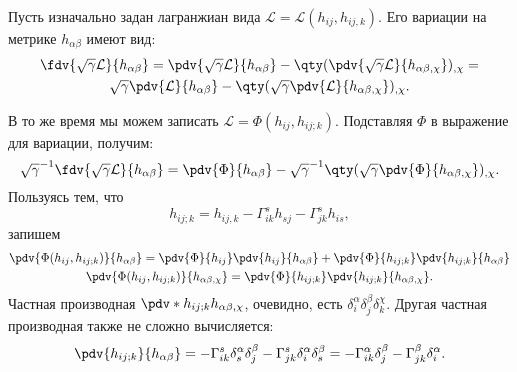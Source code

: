 \documentclass[\docroot/reports/draft/report.tex]{subfiles}
\begin{document}
    Пусть изначально задан лагранжиан вида $\mathcal{L} = \mathcal{L}(h_{ij}, h_{ij,k})$. Его вариации на метрике $h_{\alpha\beta}$ имеют вид:
    \begin{gather*}
        \fdv{\sqrt{\gamma}\mathcal{L}}{h_{\alpha\beta}} =
            \pdv{\sqrt{\gamma}\mathcal{L}}{h_{\alpha\beta}} - \qty(\pdv{\sqrt{\gamma}\mathcal{L}}{h_{\alpha\beta,\chi}})_{,\chi} = \\
            \sqrt{\gamma}\pdv{\mathcal{L}}{h_{\alpha\beta}} - \qty(\sqrt{\gamma}\pdv{\mathcal{L}}{h_{\alpha\beta,\chi}})_{,\chi}
        .
    \end{gather*}

    В то же время мы можем записать $\mathcal{L} = \Phi(h_{ij}, h_{ij;k})$. Подставляя $\Phi$ в выражение для вариации, получим:
    \begin{equation*}
        \sqrt{\gamma}^{-1}\fdv{\sqrt{\gamma}\mathcal{L}}{h_{\alpha\beta}} = \pdv{\Phi}{h_{\alpha\beta}} - \sqrt{\gamma}^{-1}\qty(\sqrt{\gamma}\pdv{\Phi}{h_{\alpha\beta,\chi}})_{,\chi} .
    \end{equation*}
    Пользуясь тем, что
    \begin{equation*}
        h_{ij;k} = h_{ij,k} - \Gamma^s_{ik} h_{sj} - \Gamma^s_{jk} h_{is},
    \end{equation*}
    запишем
    \begin{gather*}
        \pdv{\Phi(h_{ij}, h_{ij;k})}{h_{\alpha\beta}} =
            \pdv{\Phi}{h_{ij}} \pdv{h_{ij}}{h_{\alpha\beta}} +
            \pdv{\Phi}{h_{ij;k}} \pdv{h_{ij;k}}{h_{\alpha\beta}} \\
        \pdv{\Phi(h_{ij}, h_{ij;k})}{h_{\alpha\beta,\chi}} =
            \pdv{\Phi}{h_{ij;k}} \pdv{h_{ij;k}}{h_{\alpha\beta,\chi}} .
    \end{gather*}
    Частная производная $\pdv*{h_{ij;k}}{h_{\alpha\beta,\chi}}$, очевидно, есть $\delta_i^\alpha \delta_j^\beta \delta_k^\chi$. Другая частная производная также не сложно вычисляется:
    \begin{equation*}
        \pdv{h_{ij;k}}{h_{\alpha\beta}} =
            - \Gamma^s_{ik} \delta_s^\alpha \delta_j^\beta - \Gamma^s_{jk} \delta_i^\alpha \delta_s^\beta =
            - \Gamma^\alpha_{ik} \delta_j^\beta - \Gamma^\beta_{jk} \delta_i^\alpha .
    \end{equation*}
\end{document}
